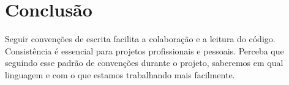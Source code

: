 \documentclass[12pt,a4paper]{article}
\begin{document}
\section*{Conclusão}
Seguir convenções de escrita facilita a colaboração e a leitura do código. Consistência é essencial para projetos profissionais e pessoais. Perceba que seguindo esse padrão de convenções durante o projeto, saberemos em qual linguagem e com o que estamos trabalhando mais facilmente.
\end{document}
